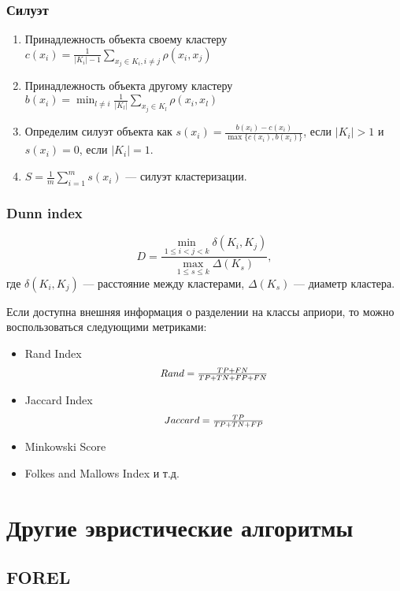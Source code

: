 \documentclass[12pt,pdf,notheorems]{beamer}
\renewcommand{\leq}{\leqslant}
\begin{document}
\begin{frame}\frametitle{Силуэт}
	\begin{enumerate}
		\item Принадлежность объекта своему кластеру $c(x_i) = \frac{1}{|K_i| - 1} \sum_{x_j \in K_i, i \neq j} \rho(x_i, x_j)$

		\item Принадлежность объекта другому кластеру $b(x_i) = \min_{l \neq i} \frac{1}{|K_l|} \sum_{x_j \in K_l} \rho(x_i, x_l)$

		\item Определим силуэт объекта как $s(x_i) = \frac{b(x_i) - c(x_i)}{\max \{ c(x_i), b(x_i) \}}$, если $|K_i| > 1$ и $s(x_i) =0 $, если $|K_i|=1$.

		\item $S = \frac{1}{m} \sum_{i=1}^m s(x_i)$ --- силуэт кластеризации.
	\end{enumerate}
\end{frame}

\begin{frame}\frametitle{Dunn index}
	$$D = \frac{\min_{1 \leq i < j < k} \delta(K_i, K_j)}{\max_{1 \leq s \leq k} \Delta(K_s)},$$
	где $\delta(K_i, K_j)$ --- расстояние между кластерами, $\Delta(K_s)$ --- диаметр кластера.
\end{frame}

\begin{frame}
	Если доступна внешняя информация о разделении на классы априори, то можно воспользоваться следующими метриками:
	\begin{itemize}
		\item Rand Index $$\scalebox{0.9}{$Rand = \frac{TP + FN}{TP + TN +FP +FN}$}$$
	\item Jaccard Index $$\scalebox{0.9}{$Jaccard = \frac{TP}{TP+TN+FP}$}$$
	\item Minkowski Score
	\item Folkes and Mallows Index и т.д.
	\end{itemize}
	\end{frame}


\section[Другие эвристические алгоритмы]{Другие эвристические алгоритмы}

\subsection[FOREL]{FOREL}
\end{document}
